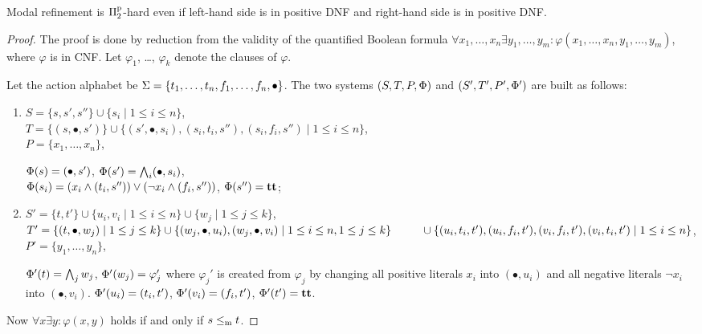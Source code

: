 \begin{proposition}\label{p:ldpd}
Modal refinement is $\mathrm\Pi^\mathrm p_2$-hard even if left-hand side is in positive DNF and
right-hand side is in positive DNF.
\end{proposition}
\begin{proof}

The proof is done by reduction from the validity of the quantified
Boolean formula
$\forall x_1, \ldots, x_n \exists y_1, \ldots, y_m : 
\varphi(x_1, \ldots, x_n, y_1, \ldots, y_m)$, where $\varphi$ is in CNF.
Let $\varphi_1$, \ldots, $\varphi_k$ denote the clauses of $\varphi$.


Let the action alphabet be $\mathrm{\Sigma} = \{ t_1, \ldots, t_n, f_1, \ldots, f_n, \bullet \}$.
The two systems $(S,T,P,\mathrm{\Phi})$ and $(S',T',P',\mathrm{\Phi}')$ are built as
follows: 
\begin{enumerate}
    \item 
$S = \{s,s',s'' \} \cup \{s_i \mid 1 \le i \le n\}$,\\
$T = \{(s,\bullet,s')\} \cup \{ (s',\bullet,s_i), (s_i, t_i, s''), 
(s_i, f_i, s'') \mid 1 \le i \le n\}$,\\
$P = \{ x_1, \ldots, x_n\}$,
 
$\mathrm{\Phi}(s) = (\bullet,s')$,
  $\mathrm{\Phi}(s') = \bigwedge_i (\bullet,s_i)$,\\
  $\mathrm{\Phi}(s_i) = (x_i \wedge (t_i,s'')) \vee (\neg x_i \wedge (f_i,s''))$,
  $\mathrm{\Phi}(s'') = \mathbf{tt}$;

\item 
$S' = \{t,t'\} \cup \{ u_i, v_i \mid 1 \le i \le n \}
\cup \{ w_j \mid 1 \le j \le k \}$,\\
$T' = \{ (t,\bullet,w_j) \mid  1 \le j \le k \}
\cup \{ (w_j,\bullet,u_i), (w_j,\bullet,v_i) \mid
1 \le i \le n,  1 \le j \le k \}
\\ ~~\qquad \cup \{ (u_i,t_i,t'), (u_i,f_i,t'), (v_i,f_i,t'), (v_i,t_i,t')
\mid 1 \le i \le n \}$, \\
$P' = \{y_1, \ldots, y_n \}$,

$\mathrm{\Phi}'(t) = \bigwedge_j w_j$,
$\mathrm{\Phi}'(w_j) = \varphi_j'$ where $\varphi_j'$ is created from
$\varphi_j$ by changing all positive literals $x_i$ into $(\bullet,u_i)$
and all negative literals $\neg x_i$ into $(\bullet,v_i)$.
$\mathrm{\Phi}'(u_i) = (t_i,t')$, $\mathrm{\Phi}'(v_i) = (f_i,t')$, $\mathrm{\Phi}'(t') = \mathbf{tt}$.

\end{enumerate}

Now $\forall x \exists y : \varphi(x,y)$ holds if
and only if $s \le_\mathrm m t$.
\end{proof}

